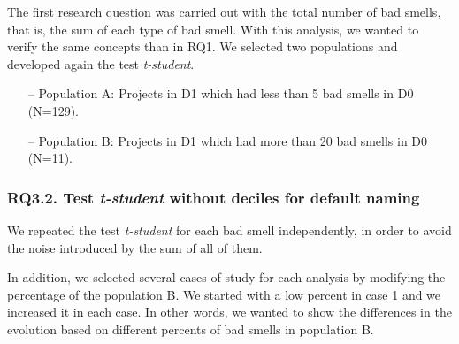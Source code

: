 The first research question was carried out with the total number of bad smells, that is, the sum of each type of bad smell. With this analysis, we wanted to verify the same concepts than in RQ1. We selected two populations and developed again the test \textit{t-student}.

\begin{itemize}
    \item[--] Population A: Projects in D1 which had less than 5 bad smells in D0 (N=129).
    \item[--] Population B: Projects in D1 which had more than 20 bad smells in D0 (N=11).
\end{itemize}


\subsubsection{RQ3.2. Test \textit{t-student} without deciles for default naming}
\label{subsubsec:RQ3_2_statistical}

We repeated the test \textit{t-student} for each bad smell independently, in order to avoid the noise introduced by the sum of all of them.

In addition, we selected several cases of study for each analysis by modifying the percentage of the population B. We started with a low percent in case 1 and we increased it in each case. In other words, we wanted to show the differences in the evolution based on different percents of bad smells in population B.

